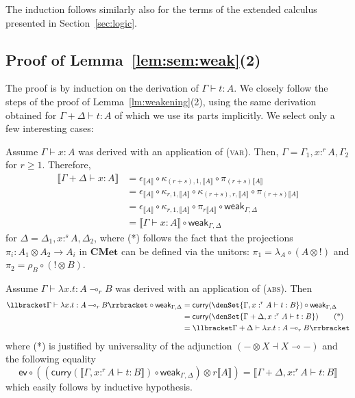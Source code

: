 \documentclass[a4paper,UKenglish,cleveref, autoref, thm-restate]{lipics-v2021}
\newcommand{\lol}{\mathbin{\multimap}}
\newcommand{\cat}[1]{\mathbf{#1}}
\newcommand{\CMet}{\cat{CMet}}
\newcommand{\mprod}{\otimes}
\newcommand{\mexp}{\lol}
\newcommand{\semweak}{\mathsf{weak}}
\newcommand{\ts}{\vdash}
\newcommand{\hastype}[3]{#1\ts #2 : #3}
\newcommand{\curry}{\mathsf{curry}}
\newcommand{\eval}{\mathsf{ev}}
\newcommand{\den}[1]{\llbracket #1\rrbracket}
\begin{document}
The induction follows similarly also for the terms of the extended 
calculus presented in Section~\ref{sec:logic}.

\subsection*{Proof of Lemma~\ref{lem:sem:weak}(2)}
The proof is by induction on the derivation of $\hastype{\Gamma}tA$. We closely follow the steps of the proof of Lemma~\ref{lm:weakening}(2), using the same derivation obtained for $\hastype{\Gamma+\Delta}{t}{A}$ of which we use its parts implicitly. 
We select only a few interesting cases:
\begin{description}[wide, font=\sc]

\item[Case (var):] Assume $\hastype{\Gamma}{x}{A}$ was derived with an application of (\textsc{var}). Then, $\Gamma = \Gamma_1, x:^rA, \Gamma_2$ for $r \geq 1$. Therefore,
\begin{align*}
\den{\hastype{\Gamma+\Delta}{x}{A}}
&= \epsilon_{\den A} \circ \kappa_{(r+s),1,\den A} \circ \pi_{(r+s)\den A} \\
&= \epsilon_{\den A} \circ \kappa_{r,1,\den A} \circ \kappa_{(r+s),r,\den A} \circ \pi_{(r+s)\den A} \\
&= \epsilon_{\den A} \circ \kappa_{r,1,\den A} \circ \pi_{r\den A}\circ \semweak_{\Gamma,\Delta} \tag{*}\\
&= \den{\hastype{\Gamma}{x}{A}}\circ \semweak_{\Gamma,\Delta}
\end{align*}
for $\Delta = \Delta_1, x:^sA, \Delta_2$, 
where (*) follows the fact 
that the projections $\pi_i \colon A_1\mprod A_2 \to A_i$ in $\CMet$ can be defined via the unitors: $\pi_1 = \lambda_A \circ (A \mprod !)$ and $\pi_2 = \rho_B \circ (! \mprod B)$.

\item[Case (abs):] Assume $\hastype{\Gamma}{\lambda x.t}{A \lol_r B}$ was derived with an application of (\textsc{abs}). Then
\begin{align*}
\den{\hastype{\Gamma}{\lambda x. t}{A \lol_r B}} \circ \semweak_{\Gamma,\Delta}
&= \curry(\denSet{\hastype{\Gamma,x:^rA}{t}{B}}) \circ \semweak_{\Gamma,\Delta} \\
&= \curry(\denSet{\hastype{\Gamma+\Delta,x:^rA}{t}{B}}) \tag{*} \\
&= \den{\hastype{\Gamma+\Delta}{\lambda x. t}{A \lol_r B}}
\end{align*}
where (*) is justified by universality of the adjunction $(-\mprod X \dashv X \mexp -)$ and the following equality 
\begin{equation*}
\eval \circ ((\curry(\den{\hastype{\Gamma,x:^rA}{t}{B}}) \circ \semweak_{\Gamma,\Delta}) \mprod r\den A)
= \den{\hastype{\Gamma+\Delta,x:^rA}{t}{B}}
\end{equation*}
which easily follows by inductive hypothesis.


\end{description}
\end{document}
